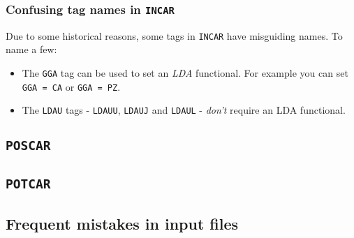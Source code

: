 \documentclass[hyperref, a4paper]{article}
\begin{document}
\subsubsection{Confusing tag names in \texttt{INCAR}}

Due to some historical reasons, some tags in \texttt{INCAR} have misguiding names.
To name a few:
\begin{itemize}
    \item The \texttt{GGA} tag can be used to set an \emph{LDA} functional. For example you can set \texttt{GGA = CA} or \texttt{GGA = PZ}.
    \item The \texttt{LDAU} tags - \texttt{LDAUU}, \texttt{LDAUJ} and \texttt{LDAUL} - \emph{don't} require an LDA functional. 
\end{itemize}

\subsection{\texttt{POSCAR}}

\subsection{\texttt{POTCAR}}



\subsection{Frequent mistakes in input files}
\end{document}
